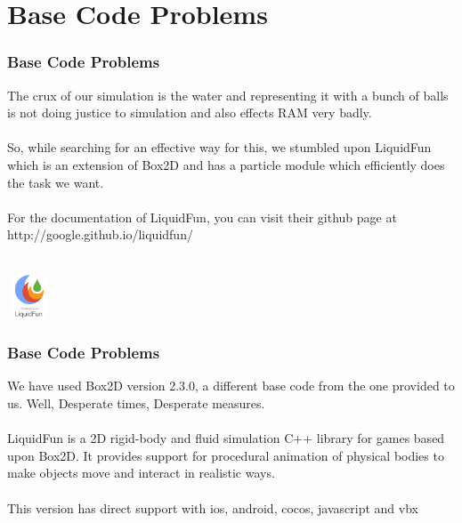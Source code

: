 \documentclass[t,compress,11pt,xcolor=dvipsnames]{beamer}
\begin{document}
\section{ Base Code Problems}
\begin{frame}
\frametitle{Base Code Problems}
The crux of our simulation is the water and representing it with a bunch of balls is not doing justice to simulation and also effects RAM very badly.\\~\\

So, while searching for an effective way for this, we stumbled upon LiquidFun which is an extension of Box2D and has a particle module which efficiently does the task we want. \\~\\

For the documentation of LiquidFun, you can visit their github page at http://google.github.io/liquidfun/  \\~\\
\begin{center}
\includegraphics[width=50px,height=50px]{liq.png}
\end{center}

\end{frame}
\begin{frame}
\frametitle{Base Code Problems}
We have used Box2D version 2.3.0, a different base code from the one provided to us. Well, Desperate times, Desperate measures. \\~\\
LiquidFun is a 2D rigid-body and fluid simulation C++ library for games based upon Box2D. It provides support for procedural animation of physical bodies to make objects move and interact in realistic ways.\\~\\
This version has direct support with ios, android, cocos, javascript and vbx\\~\\
\end{frame}
\end{document}
